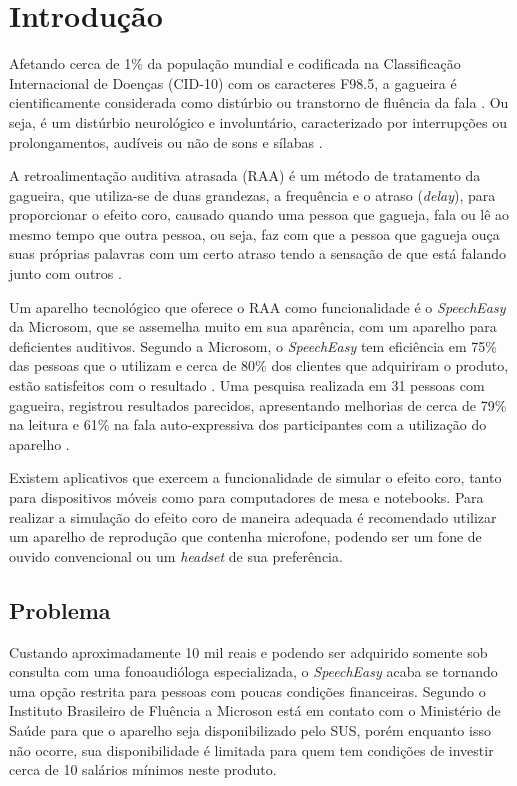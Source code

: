 \chapter{Introdu\c{c}\~ao}

Afetando cerca de 1\% da popula\c{c}\~ao mundial e codificada na Classifica\c{c}\~ao Internacional de Doen\c{c}as (CID-10) com os caracteres F98.5, a gagueira \'e cientificamente considerada como dist\'urbio ou transtorno de flu\^encia da fala \cite{Merlo2013}. Ou seja, \'e um dist\'urbio neurol\'ogico e involunt\'ario, caracterizado por interrup\c{c}\~oes ou prolongamentos, aud\'iveis ou n\~ao de sons e s\'ilabas \cite{Buechel2004}.

A retroalimenta\c{c}\~ao auditiva atrasada (RAA) \'e um m\'etodo de tratamento da gagueira, que utiliza-se de duas grandezas, a frequ\^encia e o atraso (\textit{delay}), para proporcionar o efeito coro, causado quando uma pessoa que gagueja, fala ou l\^e ao mesmo tempo que outra pessoa, ou seja, faz com que  a pessoa que gagueja ou\c{c}a suas pr\'oprias palavras com um certo atraso tendo a sensa\c{c}\~ao de que est\'a falando junto com outros \cite{Udemo2008}.

Um aparelho tecnol\'ogico que oferece o RAA como funcionalidade \'e o \textit{SpeechEasy} da Microsom, que se assemelha muito em sua apar\^encia, com um aparelho para deficientes auditivos. Segundo a Microsom, o \textit{SpeechEasy} tem efici\^encia em 75\% das pessoas que o utilizam e cerca de 80\% dos clientes que adquiriram o produto, est\~ao satisfeitos com o resultado \cite{Microson2015}. Uma pesquisa realizada em 31 pessoas com gagueira, registrou resultados parecidos, apresentando melhorias de cerca de 79\% na leitura e 61\% na fala auto-expressiva dos participantes com a utiliza\c{c}\~ao do aparelho \cite{Andrade2008}. 

Existem aplicativos que exercem a funcionalidade de simular o efeito coro, tanto para dispositivos m\'oveis como para computadores de mesa e notebooks. Para realizar a simula\c{c}\~ao do efeito coro de maneira adequada \'e recomendado utilizar um aparelho de reprodu\c{c}\~ao que contenha microfone, podendo ser um fone de ouvido convencional ou um \textit{headset} de sua prefer\^encia.

 
\section{Problema}

Custando aproximadamente 10 mil reais e podendo ser adquirido somente sob consulta com uma fonoaudi\'ologa especializada, o \textit{SpeechEasy} acaba se tornando uma op\c{c}\~ao restrita para pessoas com poucas condi\c{c}\~oes financeiras. Segundo o Instituto Brasileiro de Flu\^encia a Microson est\'a em contato com o Minist\'erio de Sa\'ude para que o aparelho seja disponibilizado pelo SUS, por\'em enquanto isso n\~ao ocorre, sua disponibilidade \'e limitada para quem tem condi\c{c}\~oes de investir cerca de 10 sal\'arios m\'inimos neste produto.

